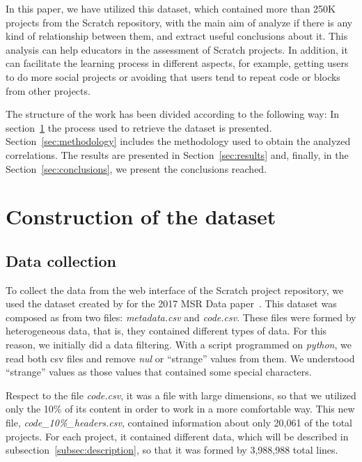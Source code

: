 \documentclass[a4paper,twocolumn,10pt]{article}
\begin{document}
In this paper, we have utilized this dataset, which contained more than 250K projects from the Scratch repository, with the
main aim of analyze if there is any kind of relationship between them, and extract useful conclusions about it. 
This analysis can help educators in the assessment of Scratch projects. In addition, it can facilitate the learning process
in different aspects, for example, getting users to do more social projects or avoiding that users tend to repeat
code or blocks from other projects.


The structure of the work has been divided according to the following way: In section~\ref{sec:construction} the process used to retrieve the dataset is presented. Section~\ref{sec:methodology} includes the methodology used to obtain the analyzed correlations.
The results are presented in Section~\ref{sec:results} and, finally, in the Section~\ref{sec:conclusions}, we present the conclusions reached.



\section{Construction of the dataset}
\label{sec:construction}

\subsection{Data collection}

To collect the data from the web interface of the Scratch
project repository, we used the dataset created by for the 2017 MSR Data paper~\cite{aivaloglou2017dataset}.
This dataset was composed as from two files: \textit{metadata.csv} and
\textit{code.csv}. These files were formed by heterogeneous data, that is,
they contained different types of data. For this reason, we initially
did a data filtering. With a script programmed on \textit{python}, we read
both csv files and remove \textit{nul} or ``strange'' values from them.
We understood ``strange'' values as those values that contained some special
characters.

Respect to the file \textit{code.csv}, it was a file with large dimensions,
so that we utilized only the 10\% of its content in order to work in a more
comfortable way. This new file, \textit{code\_10\%\_headers.csv},
contained information about only 20,061 of the total projects. For each
project, it contained different data, which will be described in
subsection~\ref{subsec:description}, so that it was formed by 3,988,988 total lines.
\end{document}

